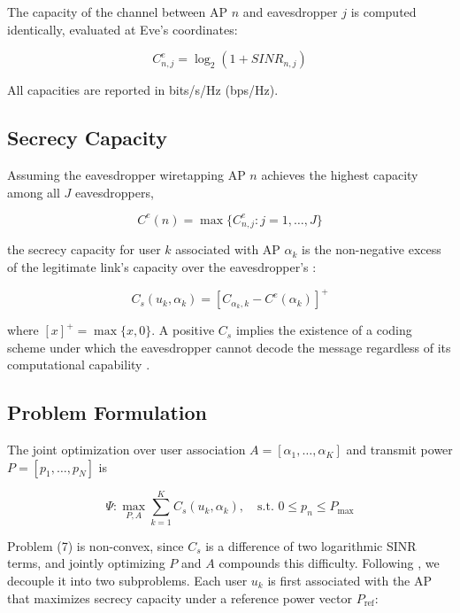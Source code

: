 \documentclass[conference]{IEEEtran}
\begin{document}
The capacity of the channel between AP $n$ and eavesdropper $j$ is computed identically, evaluated at Eve's coordinates:

\begin{equation}
C^e_{n,j}=\log_2(1+SINR_{n,j})
\end{equation}

All capacities are reported in bits/s/Hz (bps/Hz).

\subsection{Secrecy Capacity}

Assuming the eavesdropper wiretapping AP $n$ achieves the highest capacity among all $J$ eavesdroppers,

\begin{equation}
C^e(n)=\max\{C^e_{n,j}:j=1,\dots,J\}
\end{equation}

the secrecy capacity for user $k$ associated with AP $\alpha_k$ is the non-negative excess of the legitimate link's capacity over the eavesdropper's \cite{wyner,gaussian,broadcast}:

\begin{equation}
C_s(u_k,\alpha_k)=
\left[C_{\alpha_k,k}-C^e(\alpha_k)\right]^+
\end{equation}

where $[x]^+=\max\{x,0\}$. A positive $C_s$ implies the existence of a coding scheme under which the eavesdropper cannot decode the message regardless of its computational capability \cite{wyner}.

\subsection{Problem Formulation}

The joint optimization over user association $A=[\alpha_1,\dots,\alpha_K]$ and transmit power $P=[p_1,\dots,p_N]$ is

\begin{equation}
\Psi:\max_{P,A}\sum_{k=1}^{K}C_s(u_k,\alpha_k),
\quad
\text{s.t. }0\leq p_n\leq P_{\max}
\end{equation}

Problem (7) is non-convex, since $C_s$ is a difference of two logarithmic SINR terms, and jointly optimizing $P$ and $A$ compounds this difficulty. Following \cite{hoseini}, we decouple it into two subproblems. Each user $u_k$ is first associated with the AP that maximizes secrecy capacity under a reference power vector $P_{\text{ref}}$:
\end{document}

